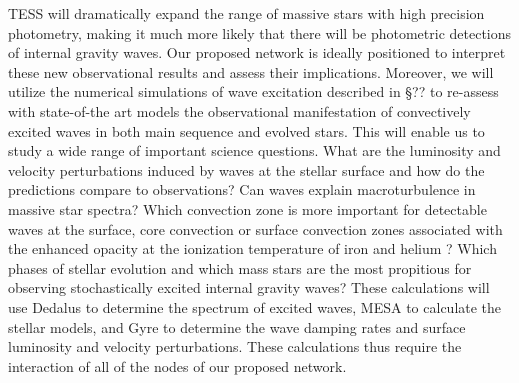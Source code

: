 TESS will dramatically expand the range of massive stars with high precision photometry, making it much more likely that there will be photometric detections of internal gravity waves.   Our proposed network is ideally positioned to interpret these new observational results and assess their implications.   Moreover, we will utilize the numerical simulations of wave excitation described in \S ?? to re-assess with state-of-the art models the observational manifestation of convectively excited waves in both main sequence and evolved stars.  This will enable us to study a wide range of important science questions. What are the luminosity and velocity perturbations induced by waves at the stellar surface and how do the predictions compare to observations?   Can waves explain macroturbulence in massive star spectra? Which convection zone is more important for detectable waves at the surface, core convection or surface convection zones associated with the enhanced opacity at the ionization temperature of iron and helium \citep{Cantiello2009}? Which phases of stellar evolution and which mass stars are the most propitious for observing stochastically excited internal gravity waves?  These calculations will use Dedalus to determine the spectrum of excited waves, MESA to calculate the stellar models, and Gyre to determine the wave damping rates and surface luminosity and velocity perturbations.  These calculations thus require the interaction of all of the nodes of our proposed network.
